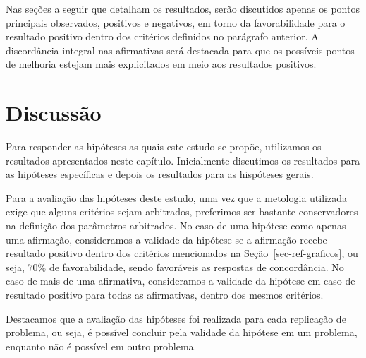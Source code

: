 Nas seções a seguir que detalham os resultados, serão discutidos apenas os
pontos principais observados, positivos e negativos, em torno da
favorabilidade para o resultado positivo dentro dos critérios
definidos no parágrafo anterior.
A discordância integral nas afirmativas será destacada para que
os possíveis pontos de melhoria estejam mais explicitados em meio
aos resultados positivos.







\section{Discussão}
\label{sec-avaliacao-hipoteses}
Para responder as hipóteses as quais este estudo se propõe, utilizamos
os resultados apresentados neste capítulo.
Inicialmente discutimos os resultados para as hipóteses
específicas e depois os resultados para as hispóteses gerais.

Para a avaliação das hipóteses deste estudo, uma vez que a
metologia utilizada exige que alguns critérios sejam
arbitrados, preferimos ser bastante conservadores
na definição dos parâmetros arbitrados.
No caso de uma hipótese como apenas uma afirmação, consideramos
a validade da hipótese se a afirmação recebe
resultado positivo dentro dos critérios mencionados na
Seção~\ref{sec-ref-graficos}, ou seja, $70\%$ de favorabilidade,
sendo favoráveis as respostas de concordância.
No caso de mais de uma afirmativa, consideramos a validade
da hipótese em caso de resultado positivo para todas
as afirmativas, dentro dos mesmos critérios.

Destacamos que a avaliação das hipóteses foi realizada para
cada replicação de problema, ou seja, é possível concluir pela
validade da hipótese em um problema, enquanto não é possível
em outro problema.


\AprovacaoHipoteseResultado{}{}{}{}{}{}{}{}{}


